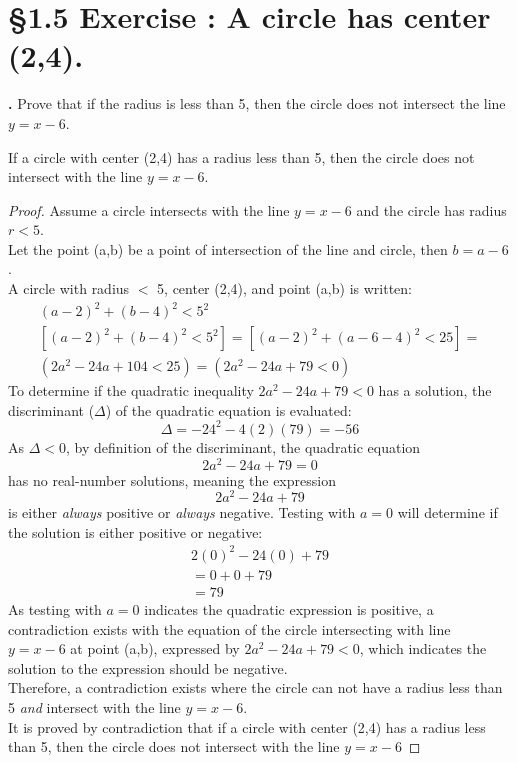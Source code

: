 \documentclass[a4paper,11pt]{article}
\begin{document}
\section*{\S 1.5 Exercise : A circle has center {(2,4)}.}
\setcounter{SubsectionCounter}{2}
\noindent\textbf{.}
 Prove that if the radius is less than 5, then the circle does not intersect the line 
\(y=x-6\).

\begin{theorem8}
If a circle with center {(2,4)} has a radius less than 5, then the circle does not 
intersect with the line \(y=x-6\).
\begin{proof}
Assume a circle intersects with the line \(y=x-6\) and the circle has radius \(r < 
5\).\\
Let the point {(a,b)} be a point of intersection of the line and circle, then 
\(b=a-6\).\\
A circle with radius \(<\) 5, center (2,4), and point (a,b) is written:
\begin{multline*}
  {(a-2)}^2 + {(b-4)}^2 < 5^2\\
  [{(a-2)}^2 + {(b-4)}^2 < 5^2] = [{(a-2)}^2 + {(a-6-4)}^2 < 25] =\\
  {(2a^2 - 24a + 104 < 25)} = {(2a^2 - 24a + 79 < 0)}
\end{multline*}
To determine if the quadratic inequality \(2a^2 - 24a + 79 < 0\) has a solution, the 
discriminant (\(\Delta\)) of the quadratic equation is evaluated:
\begin{equation*}
  \Delta = -24^2 - 4(2)(79) = -56
\end{equation*}
As \(\Delta < 0\), by definition of the discriminant, the quadratic equation 
\[2a^2 - 24a + 79 = 0\] has no real-number solutions, meaning the expression \[2a^2 - 24a + 79\] is either \textit{always} positive or \textit{always} negative. Testing with \(a=0\) will determine if the solution is either positive or negative:\\
\begin{multline*}
  2{(0)}^2-24{(0)}+79\\
  =0+0+79\\
  =79
\end{multline*}
As testing with \(a=0\) indicates the quadratic expression is positive, a contradiction exists with the equation of the circle intersecting with line \(y=x-6\) at point (a,b), expressed by \(2a^2 - 24a + 79 < 0\), which indicates the solution to the expression should be negative.\\
Therefore, a contradiction exists where the circle can not have a radius less than 5 \textit{and} intersect with the line \(y=x-6\).\\
It is proved by contradiction that if a circle with center {(2,4)} has a radius 
less than 5, then the circle does not intersect with the line \(y=x-6\)
\end{proof}
\end{theorem8}
\end{document}

